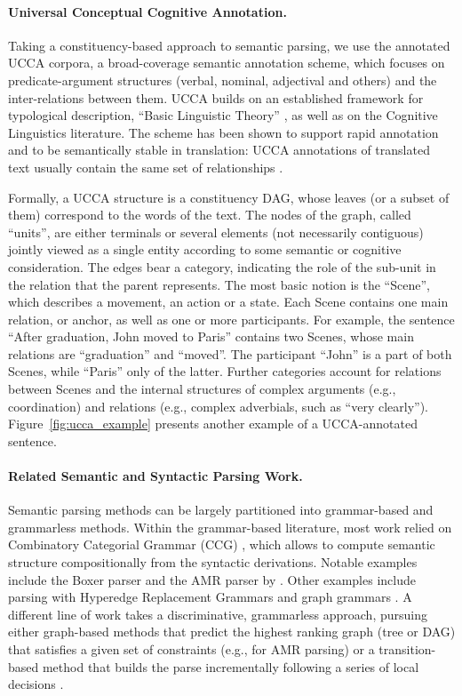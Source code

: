\documentclass[11pt]{article}
\newcommand{\figref}[1]{Figure~\ref{#1}}
\begin{document}
\paragraph{Universal Conceptual Cognitive Annotation.}
Taking a constituency-based approach to semantic parsing,
we use the annotated UCCA corpora, a broad-coverage semantic annotation scheme,
which focuses on predicate-argument structures (verbal, nominal, adjectival and others)
and the inter-relations between them. UCCA \cite{abend2013universal} builds on an established
framework for typological description, ``Basic Linguistic Theory''
\cite{Dixon:10b,Dixon:10a,Dixon:12}, as well as on the Cognitive Linguistics literature. The scheme
has been shown to support rapid annotation and to be semantically stable in translation: UCCA
annotations of translated text usually contain the same set of relationships
\cite{sulem2015conceptual}.

Formally, a UCCA structure is a constituency DAG, whose leaves (or a subset of them) correspond to the words of the text. The nodes of the graph, called ``units'', are either terminals or several elements (not necessarily contiguous) jointly viewed as a single entity according to some semantic or cognitive consideration. The edges bear a category, indicating the role of the sub-unit in the relation that the parent represents. 
The most basic notion is the ``Scene'', which describes a movement, an action or a state.
Each Scene contains one main relation, or anchor, as well as one or more participants. 
For example, the sentence ``After graduation, John moved to Paris'' contains two Scenes, whose main relations are ``graduation'' and ``moved''. The participant ``John'' is a part of both Scenes, while ``Paris'' only of the latter. Further categories account for relations between Scenes and the internal structures of complex arguments (e.g., coordination) and relations (e.g., complex adverbials, such as ``very clearly'').
\figref{fig:ucca_example} presents another example of a UCCA-annotated sentence. 

\paragraph{Related Semantic and Syntactic Parsing Work.}
Semantic parsing methods can be largely partitioned into grammar-based and grammarless methods.
Within the grammar-based literature, most work relied on Combinatory Categorial Grammar (CCG)
\cite{Steedman:00}, which allows to compute semantic structure compositionally from the
syntactic derivations. Notable examples include the Boxer parser \cite{bos2005towards}
and the AMR parser 
by . Other examples include parsing with Hyperedge Replacement Grammars
\cite{jones2012semantics,chiang2013parsing,peng2015synchronous} and
graph grammars \cite{koller2015semantic}.
A different line of work takes a discriminative, grammarless approach,
pursuing either graph-based methods that predict the highest ranking graph
(tree or DAG) that satisfies a given set of constraints (e.g., 
for AMR parsing)
or a transition-based method that builds the parse incrementally following a series of local
decisions \cite[and much subsequent work]{Nivre03anefficient}.
\end{document}
